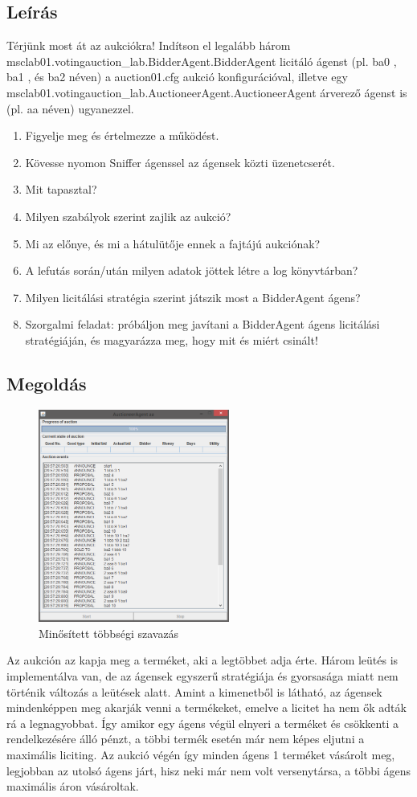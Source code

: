 \subsection{Leírás}
Térjünk  most  át  az  aukciókra!  Indítson  el  legalább  három
msclab01.votingauction\_lab.BidderAgent.BidderAgent licitáló ágenst (pl.  ba0 ,
ba1 , és  ba2 néven) a  auction01.cfg aukció
konfigurációval,  illetve  egy
msclab01.votingauction\_lab.AuctioneerAgent.AuctioneerAgent árverező
ágenst is (pl.  aa néven) ugyanezzel.
\begin{enumerate}
	\item Figyelje meg és értelmezze a működést.
	\item Kövesse nyomon Sniffer ágenssel az ágensek közti üzenetcserét.
	\item Mit tapasztal?
	\item Milyen szabályok szerint zajlik az aukció?
	\item Mi az előnye, és mi a hátulütője ennek a fajtájú aukciónak?
	\item A lefutás során/után milyen adatok jöttek létre a log
	könyvtárban?
	\item Milyen licitálási stratégia szerint játszik most a BidderAgent ágens?
	\item Szorgalmi feladat: próbáljon meg javítani a BidderAgent ágens licitálási stratégiáján, és
	magyarázza meg, hogy mit és miért csinált!
\end{enumerate}
\subsection{Megoldás}
\begin{figure}[!h]
\begin{center}
\includegraphics[height=7cm]{figures/ofel4.png}
\caption{Minősített többségi szavazás}
\end{center}
\end{figure}
Az aukción az kapja meg a terméket, aki a legtöbbet adja érte. Három leütés is implementálva van, de az ágensek egyszerű stratégiája és gyorsasága miatt nem történik változás a leütések alatt. Amint a kimenetből is látható, az ágensek mindenképpen meg akarják venni a termékeket, emelve a licitet ha nem ők adták rá a legnagyobbat. Így amikor egy ágens végül elnyeri a terméket és csökkenti a rendelkezésére álló pénzt, a többi termék esetén már nem képes eljutni a maximális liciting. Az aukció végén így minden ágens 1 terméket vásárolt meg, legjobban az utolsó ágens járt, hisz neki már nem volt versenytársa, a többi ágens maximális áron vásároltak.

